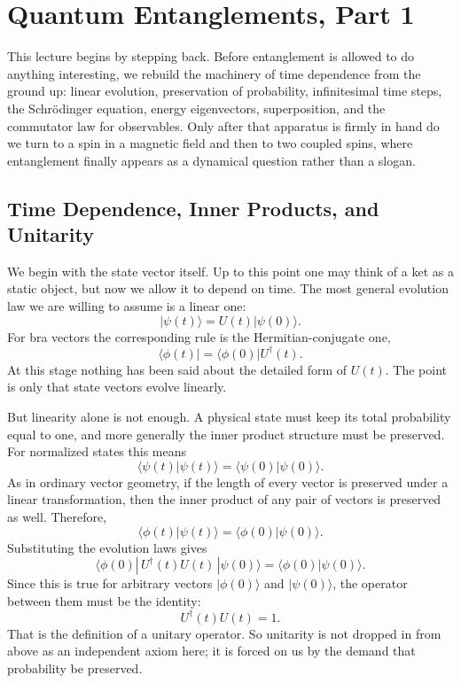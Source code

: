 \chapter{Quantum Entanglements, Part 1}

This lecture begins by stepping back. Before entanglement is allowed to do anything interesting, we rebuild the machinery of time dependence from the ground up: linear evolution, preservation of probability, infinitesimal time steps, the Schrödinger equation, energy eigenvectors, superposition, and the commutator law for observables. Only after that apparatus is firmly in hand do we turn to a spin in a magnetic field and then to two coupled spins, where entanglement finally appears as a dynamical question rather than a slogan.

\section{Time Dependence, Inner Products, and Unitarity}

We begin with the state vector itself. Up to this point one may think of a ket as a static object, but now we allow it to depend on time. The most general evolution law we are willing to assume is a linear one:
\begin{equation}
|\psi(t)\rangle = U(t)|\psi(0)\rangle.
\end{equation}
For bra vectors the corresponding rule is the Hermitian-conjugate one,
\begin{equation}
\langle \phi(t)| = \langle \phi(0)|U^\dagger(t).
\end{equation}
At this stage nothing has been said about the detailed form of \(U(t)\). The point is only that state vectors evolve linearly.

But linearity alone is not enough. A physical state must keep its total probability equal to one, and more generally the inner product structure must be preserved. For normalized states this means
\begin{equation}
\langle \psi(t)|\psi(t)\rangle = \langle \psi(0)|\psi(0)\rangle.
\end{equation}
As in ordinary vector geometry, if the length of every vector is preserved under a linear transformation, then the inner product of any pair of vectors is preserved as well. Therefore,
\begin{equation}
\langle \phi(t)|\psi(t)\rangle = \langle \phi(0)|\psi(0)\rangle.
\end{equation}
Substituting the evolution laws gives
\begin{equation}
\langle \phi(0)|\,U^\dagger(t)U(t)\,|\psi(0)\rangle
=
\langle \phi(0)|\psi(0)\rangle.
\end{equation}
Since this is true for arbitrary vectors \(|\phi(0)\rangle\) and \(|\psi(0)\rangle\), the operator between them must be the identity:
\begin{equation}
U^\dagger(t)U(t)=1.
\end{equation}
That is the definition of a unitary operator. So unitarity is not dropped in from above as an independent axiom here; it is forced on us by the demand that probability be preserved.

